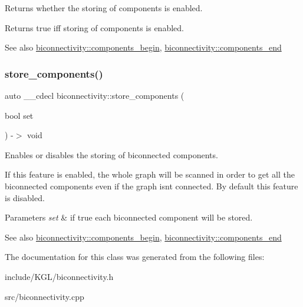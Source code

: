 Returns whether the storing of components is enabled. 

\begin{DoxyReturn}{Returns}
true iff storing of components is enabled. 
\end{DoxyReturn}
\begin{DoxySeeAlso}{See also}
\mbox{\hyperlink{classbiconnectivity_af0b3daec2b230800ac0bfb9d4671687f}{biconnectivity\+::components\+\_\+begin}}, \mbox{\hyperlink{classbiconnectivity_ac6b38a686d8008f9ec081006bf4a945e}{biconnectivity\+::components\+\_\+end}} 
\end{DoxySeeAlso}
\mbox{\label{classbiconnectivity_a85a107ff0a60722c48333b252ace0040}} 
\subsubsection{\texorpdfstring{store\+\_\+components()}{store\_components()}\hspace{0.1cm}{\footnotesize\ttfamily [2/2]}}
{\footnotesize\ttfamily auto \+\_\+\+\_\+cdecl biconnectivity\+::store\+\_\+components (\begin{DoxyParamCaption}\item[{bool}]{set }\end{DoxyParamCaption}) -\/$>$ void
	\hspace{0.3cm}{\ttfamily [inline]}}



Enables or disables the storing of biconnected components. 

If this feature is enabled, the whole graph will be scanned in order to get all the biconnected components even if the graph isn\textquotesingle{}t connected. By default this feature is disabled.


\begin{DoxyParams}{Parameters}
{\em set} & if true each biconnected component will be stored. \\
\hline
\end{DoxyParams}
\begin{DoxySeeAlso}{See also}
\mbox{\hyperlink{classbiconnectivity_af0b3daec2b230800ac0bfb9d4671687f}{biconnectivity\+::components\+\_\+begin}}, \mbox{\hyperlink{classbiconnectivity_ac6b38a686d8008f9ec081006bf4a945e}{biconnectivity\+::components\+\_\+end}} 
\end{DoxySeeAlso}


The documentation for this class was generated from the following files\+:\begin{DoxyCompactItemize}
\item 
include/\+K\+G\+L/biconnectivity.\+h\item 
src/biconnectivity.\+cpp\end{DoxyCompactItemize}
